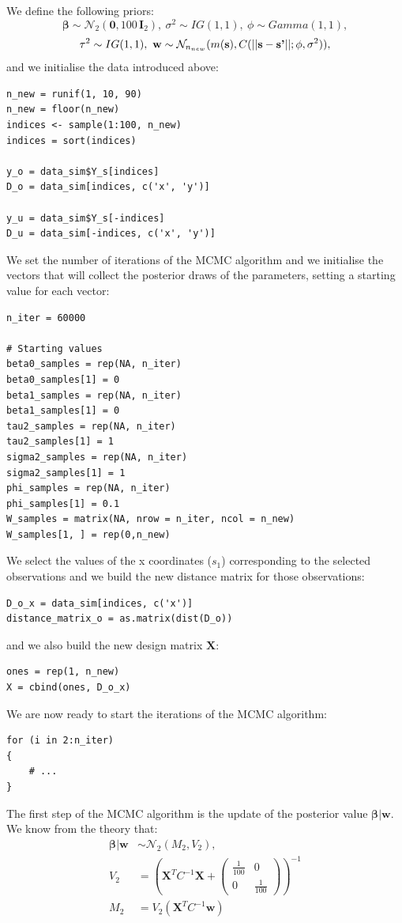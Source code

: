 \documentclass[a4paper,12pt]{article}
\begin{document}
We define the following priors:
\[ \boldsymbol{\beta} \sim \mathcal{N}_2\left(\mathbf{0}, 100 \, \mathbf{I}_2\right), \ \sigma^2 \sim IG(1,1), \ \phi \sim Gamma(1,1),  \]
\[\tau^2 \sim IG(1,1), \ \mathbf{w} \sim \mathcal{N}_{n_{new}}(m(\text{\textbf{s}}), C(||\text{\textbf{s}} - \text{\textbf{s'}}||; \phi, \sigma^2 )),\]
and we initialise the data introduced above:
\begin{lstlisting}[style=R]
n_new = runif(1, 10, 90)
n_new = floor(n_new)
indices <- sample(1:100, n_new)
indices = sort(indices)

y_o = data_sim$Y_s[indices]
D_o = data_sim[indices, c('x', 'y')]

y_u = data_sim$Y_s[-indices]
D_u = data_sim[-indices, c('x', 'y')]
\end{lstlisting}
We set the number of iterations of the MCMC algorithm and we initialise the vectors that will collect the posterior draws of the parameters, setting a starting value for each vector:
\begin{lstlisting}[style=R]
n_iter = 60000

# Starting values
beta0_samples = rep(NA, n_iter)
beta0_samples[1] = 0
beta1_samples = rep(NA, n_iter)
beta1_samples[1] = 0
tau2_samples = rep(NA, n_iter)
tau2_samples[1] = 1
sigma2_samples = rep(NA, n_iter)
sigma2_samples[1] = 1
phi_samples = rep(NA, n_iter)
phi_samples[1] = 0.1
W_samples = matrix(NA, nrow = n_iter, ncol = n_new)
W_samples[1, ] = rep(0,n_new)
\end{lstlisting}
We select the values of the x coordinates (\(s_1\)) corresponding to the selected observations and we build the new distance matrix for those observations:
\begin{lstlisting}[style=R]
D_o_x = data_sim[indices, c('x')]
distance_matrix_o = as.matrix(dist(D_o))
\end{lstlisting}
and we also build the new design matrix \(\mathbf{X}\):
\begin{lstlisting}[style=R]
ones = rep(1, n_new)
X = cbind(ones, D_o_x)
\end{lstlisting}
We are now ready to start the iterations of the MCMC algorithm:
\begin{lstlisting}[style=R]
for (i in 2:n_iter)
{
    # ...
}
\end{lstlisting}
The first step of the MCMC algorithm is the update of the posterior value \(\boldsymbol{\beta}|\mathbf{w}\). \\
We know from the theory that:
\begin{align*}
    \boldsymbol{\beta}|\mathbf{w} &\sim \mathcal{N}_2(M_2,V_2), \\
    V_2 &= \left( \mathbf{X}^T C^{-1} \mathbf{X} + \begin{pmatrix}
\frac{1}{100} & 0 \\
0 & \frac{1}{100}
\end{pmatrix} \right)^{-1} \\
    M_2 &= V_2 \left( \mathbf{X}^T C^{-1} \mathbf{w} \right)
\end{align*}
\end{document}
